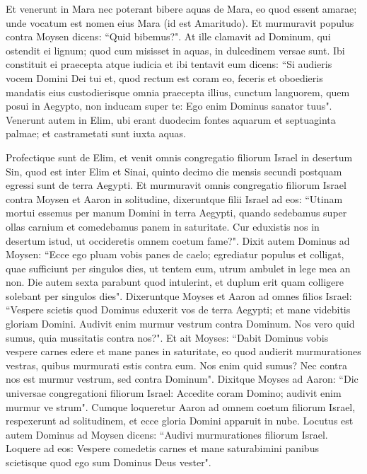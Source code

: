 \begin{biblechapter}
\verse Et venerunt in Mara nec poterant bibere aquas de Mara, eo quod essent amarae; unde vocatum est nomen eius Mara (id est Amaritudo). 
\verse Et murmuravit populus contra Moysen dicens: “Quid bibemus?". 
\verse At ille clamavit ad Dominum, qui ostendit ei lignum; quod cum misisset in aquas, in dulcedinem versae sunt. Ibi constituit ei praecepta atque iudicia et ibi tentavit eum  
\verse dicens: “Si audieris vocem Domini Dei tui et, quod rectum est coram eo, feceris et oboedieris mandatis eius custodierisque omnia praecepta illius, cunctum languorem, quem posui in Aegypto, non inducam super te: Ego enim Dominus sanator tuus". 
\verse Venerunt autem in Elim, ubi erant duodecim fontes aquarum et septuaginta palmae; et castrametati sunt iuxta aquas. 
\end{biblechapter}

\begin{biblechapter}  
\verse Profectique sunt de Elim, et venit omnis congregatio filiorum Israel in desertum Sin, quod est inter Elim et Sinai, quinto decimo die mensis secundi postquam egressi sunt de terra Aegypti. 
\verse Et murmuravit omnis congregatio filiorum Israel contra Moysen et Aaron in solitudine, 
\verse dixeruntque filii Israel ad eos: “Utinam mortui essemus per manum Domini in terra Aegypti, quando sedebamus super ollas carnium et comedebamus panem in saturitate. Cur eduxistis nos in desertum istud, ut occideretis omnem coetum fame?". 
\verse Dixit autem Dominus ad Moysen: “Ecce ego pluam vobis panes de caelo; egrediatur populus et colligat, quae sufficiunt per singulos dies, ut tentem eum, utrum ambulet in lege mea an non. 
\verse Die autem sexta parabunt quod intulerint, et duplum erit quam colligere solebant per singulos dies". 
\verse Dixeruntque Moyses et Aaron ad omnes filios Israel: “Vespere scietis quod Dominus eduxerit vos de terra Aegypti; 
\verse et mane videbitis gloriam Domini. Audivit enim murmur vestrum contra Dominum. Nos vero quid sumus, quia mussitatis contra nos?". 
\verse Et ait Moyses: “Dabit Dominus vobis vespere carnes edere et mane panes in saturitate, eo quod audierit murmurationes vestras, quibus murmurati estis contra eum. Nos enim quid sumus? Nec contra nos est murmur vestrum, sed contra Dominum". 
\verse Dixitque Moyses ad Aaron: “Dic universae congregationi filiorum Israel: Accedite coram Domino; audivit enim murmur ve strum". 
\verse Cumque loqueretur Aaron ad omnem coetum filiorum Israel, respexerunt ad solitudinem, et ecce gloria Domini apparuit in nube. 
\verse Locutus est autem Dominus ad Moysen dicens: 
\verse “Audivi murmurationes filiorum Israel. Loquere ad eos: Vespere comedetis carnes et mane saturabimini panibus scietisque quod ego sum Dominus Deus vester". 

\end{biblechapter}
